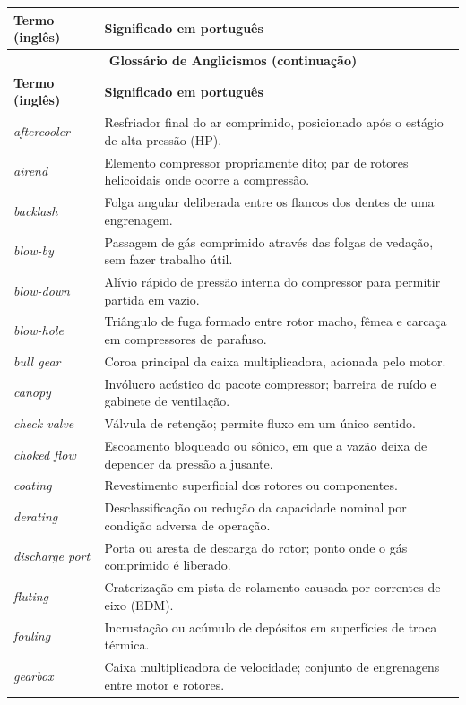 \documentclass[12pt,a4paper]{article}
\numberwithin{equation}{section}
\numberwithin{table}{section}
\numberwithin{figure}{section}
\begin{document}
{\begin{longtable}{p{4.0cm} p{10.0cm}}
\toprule
\textbf{Termo (inglês)} & \textbf{Significado em português} \\
\midrule
\endfirsthead
\multicolumn{2}{c}{{\bfseries Glossário de Anglicismos (continuação)}} \\
\toprule
\textbf{Termo (inglês)} & \textbf{Significado em português} \\
\midrule
\endhead
\bottomrule
\endfoot
\textit{aftercooler} & Resfriador final do ar comprimido, posicionado após o estágio de alta pressão (HP). \\
\textit{airend} & Elemento compressor propriamente dito; par de rotores helicoidais onde ocorre a compressão. \\
\textit{backlash} & Folga angular deliberada entre os flancos dos dentes de uma engrenagem. \\
\textit{blow-by} & Passagem de gás comprimido através das folgas de vedação, sem fazer trabalho útil. \\
\textit{blow-down} & Alívio rápido de pressão interna do compressor para permitir partida em vazio. \\
\textit{blow-hole} & Triângulo de fuga formado entre rotor macho, fêmea e carcaça em compressores de parafuso. \\
\textit{bull gear} & Coroa principal da caixa multiplicadora, acionada pelo motor. \\
\textit{canopy} & Invólucro acústico do pacote compressor; barreira de ruído e gabinete de ventilação. \\
\textit{check valve} & Válvula de retenção; permite fluxo em um único sentido. \\
\textit{choked flow} & Escoamento bloqueado ou sônico, em que a vazão deixa de depender da pressão a jusante. \\
\textit{coating} & Revestimento superficial dos rotores ou componentes. \\
\textit{derating} & Desclassificação ou redução da capacidade nominal por condição adversa de operação. \\
\textit{discharge port} & Porta ou aresta de descarga do rotor; ponto onde o gás comprimido é liberado. \\
\textit{fluting} & Craterização em pista de rolamento causada por correntes de eixo (EDM). \\
\textit{fouling} & Incrustação ou acúmulo de depósitos em superfícies de troca térmica. \\
\textit{gearbox} & Caixa multiplicadora de velocidade; conjunto de engrenagens entre motor e rotores. \\

\end{longtable}}
\end{document}
